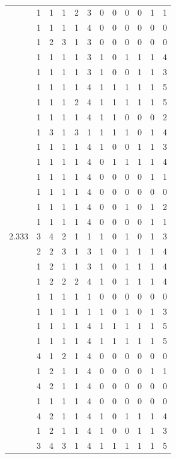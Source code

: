 \documentclass[]{msu-thesis}
\theoremstyle{definition}
\theoremstyle{definition}
\theoremstyle{definition}
\theoremstyle{remark}
\begin{document}
\begin{table}
{\begin{tabular}[t]{rrrrrrrrrrrr}
 & 1 & 1 & 1 & 2 & 3 & 0 & 0 & 0 & 0 & 1 & 1\\
 & 1 & 1 & 1 & 1 & 4 & 0 & 0 & 0 & 0 & 0 & 0\\
 & 1 & 2 & 3 & 1 & 3 & 0 & 0 & 0 & 0 & 0 & 0\\
 & 1 & 1 & 1 & 1 & 3 & 1 & 0 & 1 & 1 & 1 & 4\\
 & 1 & 1 & 1 & 1 & 3 & 1 & 0 & 0 & 1 & 1 & 3\\
 & 1 & 1 & 1 & 1 & 4 & 1 & 1 & 1 & 1 & 1 & 5\\
 & 1 & 1 & 1 & 2 & 4 & 1 & 1 & 1 & 1 & 1 & 5\\
 & 1 & 1 & 1 & 1 & 4 & 1 & 1 & 0 & 0 & 0 & 2\\
 & 1 & 3 & 1 & 3 & 1 & 1 & 1 & 1 & 0 & 1 & 4\\
 & 1 & 1 & 1 & 1 & 4 & 1 & 0 & 0 & 1 & 1 & 3\\
 & 1 & 1 & 1 & 1 & 4 & 0 & 1 & 1 & 1 & 1 & 4\\
 & 1 & 1 & 1 & 1 & 4 & 0 & 0 & 0 & 0 & 1 & 1\\
 & 1 & 1 & 1 & 1 & 4 & 0 & 0 & 0 & 0 & 0 & 0\\
 & 1 & 1 & 1 & 1 & 4 & 0 & 0 & 1 & 0 & 1 & 2\\
 & 1 & 1 & 1 & 1 & 4 & 0 & 0 & 0 & 0 & 1 & 1\\
2.333 & 3 & 4 & 2 & 1 & 1 & 1 & 0 & 1 & 0 & 1 & 3\\
 & 2 & 2 & 3 & 1 & 3 & 1 & 0 & 1 & 1 & 1 & 4\\
 & 1 & 2 & 1 & 1 & 3 & 1 & 0 & 1 & 1 & 1 & 4\\
 & 1 & 2 & 2 & 2 & 4 & 1 & 0 & 1 & 1 & 1 & 4\\
 & 1 & 1 & 1 & 1 & 1 & 0 & 0 & 0 & 0 & 0 & 0\\
 & 1 & 1 & 1 & 1 & 1 & 1 & 0 & 1 & 0 & 1 & 3\\
 & 1 & 1 & 1 & 1 & 4 & 1 & 1 & 1 & 1 & 1 & 5\\
 & 1 & 1 & 1 & 1 & 4 & 1 & 1 & 1 & 1 & 1 & 5\\
 & 4 & 1 & 2 & 1 & 4 & 0 & 0 & 0 & 0 & 0 & 0\\
 & 1 & 2 & 1 & 1 & 4 & 0 & 0 & 0 & 0 & 1 & 1\\
 & 4 & 2 & 1 & 1 & 4 & 0 & 0 & 0 & 0 & 0 & 0\\
 & 1 & 1 & 1 & 1 & 4 & 0 & 0 & 0 & 0 & 0 & 0\\
 & 4 & 2 & 1 & 1 & 4 & 1 & 0 & 1 & 1 & 1 & 4\\
 & 1 & 2 & 1 & 1 & 4 & 1 & 0 & 0 & 1 & 1 & 3\\
 & 3 & 4 & 3 & 1 & 4 & 1 & 1 & 1 & 1 & 1 & 5\\

\end{tabular}}
\end{table}
\end{document}
